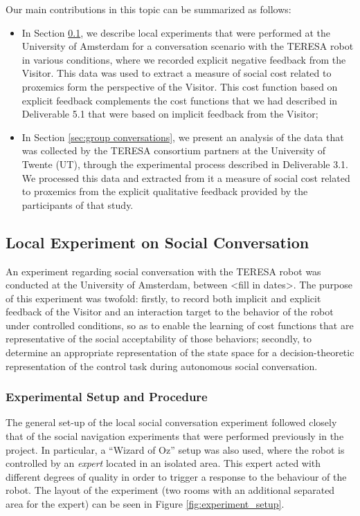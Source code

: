 \documentclass[a4paper,11pt]{report}
\begin{document}
Our main contributions in this topic can be summarized as follows:
\begin{itemize}
\item In Section \ref{sec:initial_experiment}, we describe local experiments that were performed at the University of Amsterdam for a conversation scenario with the TERESA robot in various conditions, where we recorded explicit negative feedback from the Visitor. This data was used to extract a measure of social cost related to proxemics form the perspective of the Visitor. This cost function based on explicit feedback complements the cost functions that we had described in Deliverable 5.1 that were based on implicit feedback from the Visitor;
\item In Section \ref{sec:group conversations}, we present an analysis of the data that was collected by the TERESA consortium partners at the University of Twente (UT), through the experimental process described in Deliverable 3.1. We processed this data and extracted from it a measure of social cost related to proxemics from the explicit qualitative feedback provided by the participants of that study.
\end{itemize}

\subsection{Local Experiment on Social Conversation}
\label{sec:initial_experiment}

An experiment regarding social conversation with the TERESA robot was conducted at the University of Amsterdam, between <fill in dates>. The purpose of this experiment was twofold: firstly, to record both implicit and explicit feedback of the Visitor and an interaction target to the behavior of the robot under controlled conditions, so as to enable the learning of cost functions that are representative of the social acceptability of those behaviors; secondly, to determine an appropriate representation of the state space for a decision-theoretic representation of the control task during autonomous social conversation.

\subsubsection{Experimental Setup and Procedure}

The general set-up of the local social conversation experiment followed closely that of the social navigation experiments that were performed previously in the project. In particular, a ``Wizard of Oz'' setup was also used, where the robot is controlled by an \textit{expert} located in an isolated area. This expert acted with different degrees of quality in order to trigger a response to the behaviour of the robot. The layout of the experiment (two rooms with an additional separated area for the expert) can be seen in Figure \ref{fig:experiment_setup}.
\end{document}

